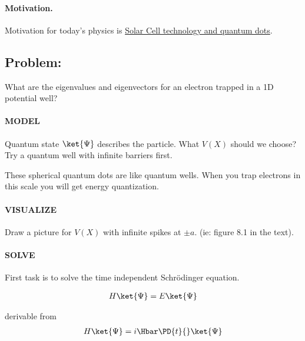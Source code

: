 %
%

\paragraph{Motivation.}  Motivation for today's physics is \href{http://physicsworld.com/cws/article/news/38046}{Solar Cell technology and quantum dots}.

\subsection{Problem:}
What are the eigenvalues and eigenvectors for an electron trapped in a 1D potential well?

\paragraph{MODEL}
Quantum state $\ket{\Psi}$ describes the particle.  What $V(X)$ should we choose?  Try a quantum well with infinite barriers first.

These spherical quantum dots are like quantum wells.  When you trap electrons in this scale you will get energy quantization.

\paragraph{VISUALIZE}
Draw a picture for $V(X)$ with infinite spikes at $\pm a$. (ie: figure 8.1 in the text).

\paragraph{SOLVE}
First task is to solve the time independent Schr\"{o}dinger equation.

\begin{equation}\label{eqn:PHY356Lecture9:1}
\begin{aligned}
H \ket{\Psi} = E \ket{\Psi}
\end{aligned}
\end{equation}

derivable from
\begin{equation}\label{eqn:PHY356Lecture9:2}
\begin{aligned}
H \ket{\Psi} = i \Hbar \PD{t}{} \ket{\Psi}
\end{aligned}
\end{equation}


